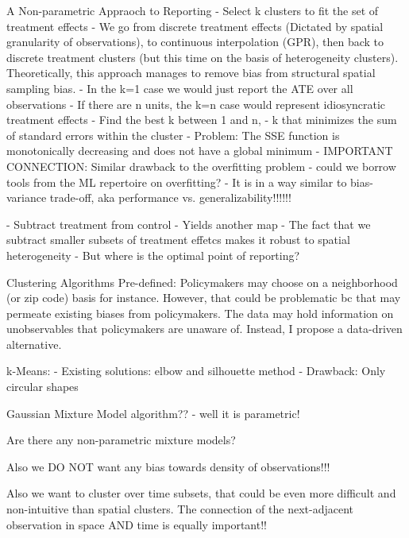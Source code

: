 \begin{frame}{A Non-parametric Appraoch to Reporting}
- Select k clusters to fit the set of treatment effects
- We go from discrete treatment effects (Dictated by spatial granularity of observations), to continuous interpolation (GPR), then back to discrete treatment clusters (but this time on the basis of heterogeneity clusters). Theoretically, this approach manages to remove bias from structural spatial sampling bias. 
- In the k=1 case we would just report the ATE over all observations
- If there are n units, the k=n case would represent idiosyncratic treatment effects
- Find the best k between 1 and n, 
- k that minimizes the sum of standard errors within the cluster
- Problem: The SSE function is monotonically decreasing and does not have a global minimum
- IMPORTANT CONNECTION: Similar drawback to the overfitting problem - could we borrow tools from the ML repertoire on overfitting?
- It is in a way similar to bias-variance trade-off, aka performance vs. generalizability!!!!!!


- Subtract treatment from control
- Yields another map
- The fact that we subtract smaller subsets of treatment effetcs makes it robust to spatial heterogeneity
- But where is the optimal point of reporting?
\end{frame}

\begin{frame}{Clustering Algorithms}
Pre-defined: Policymakers may choose on a neighborhood (or zip code) basis for instance. However, that could be problematic bc that may permeate existing biases from policymakers. The data may hold information on unobservables that policymakers are unaware of. Instead, I propose a data-driven alternative. 

k-Means:
- Existing solutions: elbow and silhouette method
- Drawback: Only circular shapes

Gaussian Mixture Model algorithm??
- well it is parametric! 

Are there any non-parametric mixture models?

Also we DO NOT want any bias towards density of observations!!!

Also we want to cluster over time subsets, that could be even more difficult and non-intuitive than spatial clusters. The connection of the next-adjacent observation in space AND time is equally important!!

\end{frame}